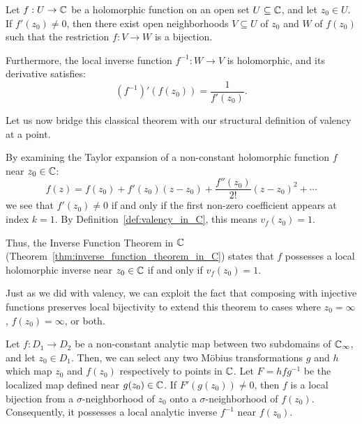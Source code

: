 \begin{theorem}
    \label{thm:inverse_function_theorem_in_C}
    Let $f: U \to \mathbb{C}$ be a holomorphic function on an open set $U \subseteq \mathbb{C}$,
    and let $z_0 \in U$. If $f'(z_0) \neq 0$, then there exist open
    neighborhoods $V \subseteq U$ of $z_0$ and $W$ of $f(z_0)$ such that the
    restriction $f: V \to W$ is a bijection.
    
    Furthermore, the local inverse function $f^{-1}: W \to V$ is holomorphic,
    and its derivative satisfies:
    \begin{equation*}
        (f^{-1})'(f(z_0)) = \frac{1}{f'(z_0)}.
    \end{equation*}
\end{theorem}

Let us now bridge this classical theorem with our structural definition of
valency at a point.

\begin{remark}
    By examining the Taylor expansion of a non-constant holomorphic function $f$
    near $z_0 \in \mathbb{C}$:
    \begin{equation*}
        f(z) = f(z_0) + f'(z_0)(z-z_0) + \frac{f''(z_0)}{2!}(z-z_0)^2 + \cdots
    \end{equation*}
    we see that $f'(z_0) \neq 0$ if and only if the first non-zero coefficient
    appears at index $k=1$. By Definition~\ref{def:valency_in_C}, this means
    $v_f(z_0) = 1$.
    
    Thus, the Inverse Function Theorem in $\mathbb{C}$
    (Theorem~\ref{thm:inverse_function_theorem_in_C}) states that $f$ possesses
    a local holomorphic inverse near $z_0 \in \mathbb{C}$ if and only if $v_f(z_0) = 1$.
\end{remark}

Just as we did with valency, we can exploit the fact that composing with
injective functions preserves local bijectivity to extend this theorem to cases
where $z_0 = \infty$, $f(z_0) = \infty$, or both.

\begin{theorem}
    \label{thm:inverse_function_theorem_in_ExtC}
    Let $f : D_1 \to D_2$ be a non-constant analytic map between two subdomains
    of $\mathbb{C}_\infty$, and let $z_0 \in D_1$. Then, we can select any two Möbius
    transformations $g$ and $h$ which map $z_0$ and $f(z_0)$ respectively to
    points in $\mathbb{C}$. Let $F = hfg^{-1}$ be the localized map defined near $g(z_0)
    \in \mathbb{C}$. If $F'(g(z_0)) \neq 0$, then $f$ is a local bijection from a
    $\sigma$-neighborhood of $z_0$ onto a $\sigma$-neighborhood of $f(z_0)$.
    Consequently, it possesses a local analytic inverse $f^{-1}$ near $f(z_0)$.
\end{theorem}

